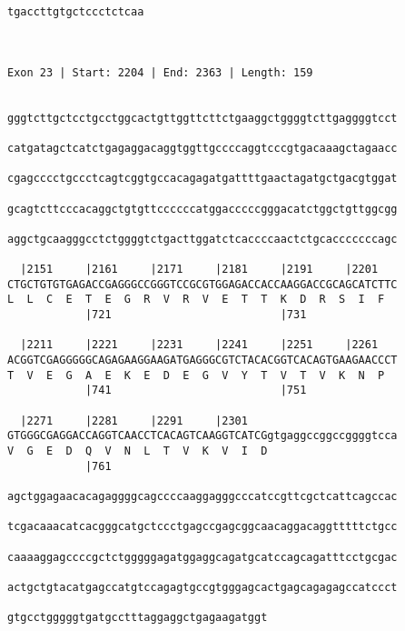 \documentclass{article}
\begin{document}
\begin{Verbatim}
tgaccttgtgctccctctcaa
                     
                     
 
Exon 23 | Start: 2204 | End: 2363 | Length: 159


gggtcttgctcctgcctggcactgttggttcttctgaaggctggggtcttgaggggtcct
                                                            
catgatagctcatctgagaggacaggtggttgccccaggtcccgtgacaaagctagaacc
                                                            
cgagcccctgccctcagtcggtgccacagagatgattttgaactagatgctgacgtggat
                                                            
gcagtcttcccacaggctgtgttccccccatggacccccgggacatctggctgttggcgg
                                                            
aggctgcaagggcctctggggtctgacttggatctcaccccaactctgcacccccccagc
                                                            
  |2151     |2161     |2171     |2181     |2191     |2201   
CTGCTGTGTGAGACCGAGGGCCGGGTCCGCGTGGAGACCACCAAGGACCGCAGCATCTTC
L  L  C  E  T  E  G  R  V  R  V  E  T  T  K  D  R  S  I  F  
            |721                          |731              
  
  |2211     |2221     |2231     |2241     |2251     |2261   
ACGGTCGAGGGGGCAGAGAAGGAAGATGAGGGCGTCTACACGGTCACAGTGAAGAACCCT
T  V  E  G  A  E  K  E  D  E  G  V  Y  T  V  T  V  K  N  P  
            |741                          |751              
  
  |2271     |2281     |2291     |2301                       
GTGGGCGAGGACCAGGTCAACCTCACAGTCAAGGTCATCGgtgaggccggccggggtcca
V  G  E  D  Q  V  N  L  T  V  K  V  I  D                    
            |761                                            
  
agctggagaacacagaggggcagccccaaggagggcccatccgttcgctcattcagccac
                                                            
tcgacaaacatcacgggcatgctccctgagccgagcggcaacaggacaggtttttctgcc
                                                            
caaaaggagccccgctctgggggagatggaggcagatgcatccagcagatttcctgcgac
                                                            
actgctgtacatgagccatgtccagagtgccgtgggagcactgagcagagagccatccct
                                                            
gtgcctgggggtgatgcctttaggaggctgagaagatggt
                                        

\end{Verbatim}
\end{document}
